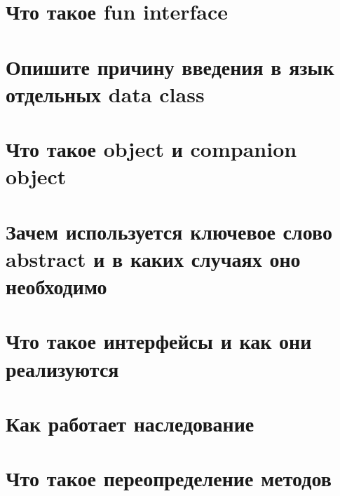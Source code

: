 \documentclass[12pt]{article}
\begin{document}
\section*{Что такое fun interface}
\begin{enumerate}[leftmargin=*]
\end{enumerate}
\vspace{2mm}
\section*{Опишите причину введения в язык отдельных data class}
\begin{enumerate}[leftmargin=*]
\end{enumerate}
\vspace{2mm}
\section*{Что такое object и companion object}
\begin{enumerate}[leftmargin=*]
\end{enumerate}
\vspace{2mm}
\section*{Зачем используется ключевое слово abstract и в каких случаях оно необходимо}
\begin{enumerate}[leftmargin=*]
\end{enumerate}
\vspace{2mm}
\section*{Что такое интерфейсы и как они реализуются}
\begin{enumerate}[leftmargin=*]
\end{enumerate}
\vspace{2mm}
\section*{Как работает наследование}
\begin{enumerate}[leftmargin=*]
\end{enumerate}
\vspace{2mm}
\section*{Что такое переопределение методов}
\begin{enumerate}[leftmargin=*]
\end{enumerate}
\vspace{2mm}
\end{document}
